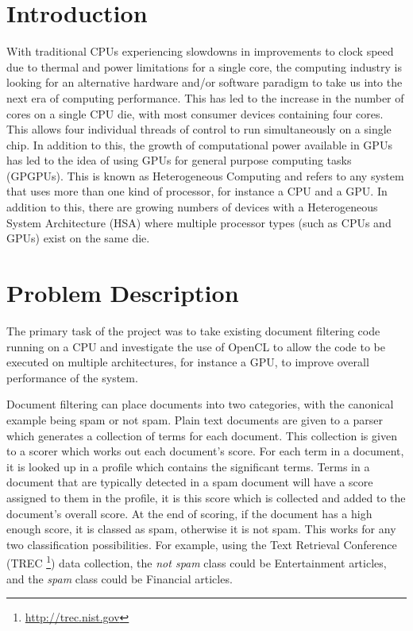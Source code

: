 \section{Introduction}

With traditional CPUs experiencing slowdowns in improvements to clock speed due
to thermal and power limitations for a single core, the computing industry is
looking for an alternative hardware and/or software paradigm to take us into the
next era of computing performance. This has led to the increase in the number of
cores on a single CPU die, with most consumer devices containing four cores.
This allows four individual threads of control to run simultaneously on a single
chip. In addition to this, the growth of computational power available in GPUs
has led to the idea of using GPUs for general purpose computing tasks (GPGPUs).
This is known as Heterogeneous Computing and refers to any system that uses more
than one kind of processor, for instance a CPU and a GPU. In addition to this,
there are growing numbers of devices with a Heterogeneous System Architecture
(HSA) where multiple processor types (such as CPUs and GPUs) exist on the same
die.

\section{Problem Description}

The primary task of the project was to take existing document filtering code
running on a CPU and investigate the use of OpenCL to allow the code to be
executed on multiple architectures, for instance a GPU, to improve overall
performance of the system.

Document filtering can place documents into two categories, with the canonical
example being spam or not spam. Plain text documents are given to a parser which
generates a collection of terms for each document. This collection is given to a
scorer which works out each document's score. For each term in a document, it is
looked up in a profile which contains the significant terms. Terms in a document
that are typically detected in a spam document will have a score assigned to
them in the profile, it is this score which is collected and added to the
document's overall score. At the end of scoring, if the document has a high
enough score, it is classed as spam, otherwise it is not spam. This works for
any two classification possibilities. For example, using the Text Retrieval
Conference (TREC \footnote{\url{http://trec.nist.gov}}) data collection, the
\emph{not spam} class could be Entertainment articles, and the \emph{spam}
class could be Financial articles.

